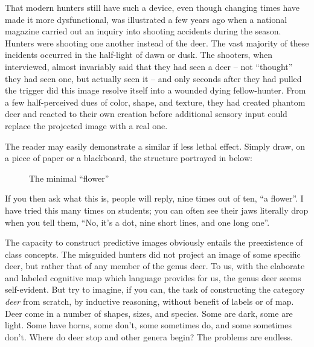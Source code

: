
That modern hunters still have such a device, even though changing times have made it more dysfunctional, was illustrated a few years ago when a national magazine carried out an inquiry into shooting accidents during the  season. Hunters were shooting one another instead of the deer. The vast majority of these incidents occurred in the half-light of dawn or dusk. The shooters, when interviewed, almost invariably said that they had seen a deer -- not ``thought'' they had seen one, but actually seen it -- and only seconds after they had pulled the trigger did this image resolve itself into a wounded dying fellow-hunter. From a few half-perceived dues of color, shape, and texture, they had created phantom deer and reacted to their own creation before additional sensory input could replace the projected image with a real one.

The reader may easily demonstrate a similar if less lethal effect. Simply draw, on a piece of paper or a blackboard, the structure portrayed in  below:

\begin{figure}
	\begin{center}
	\end{center}
	\caption{The minimal ``flower''}\label{fig:4.1}
\end{figure}


\noindent If you then ask what this is, people will reply, nine times out of ten,  ``a flower''. I have tried this many times on students; you can often see their jaws literally drop when you tell them, ``No, it's a dot, nine short lines, and one long one''.

The capacity to construct predictive images obviously entails the preexistence of class concepts. The misguided hunters did not project an image of some specific deer, but rather that of any member of the genus deer. To us, with the elaborate and labeled cognitive map which language provides for us, the genus deer seems self-evident. But try to imagine, if you can, the task of constructing the category \textit{deer} from scratch, by inductive reasoning, without benefit of labels or of map. Deer come in a number of shapes, sizes, and species. Some are dark, some are light. Some have horns, some don't, some sometimes do, and some sometimes don't. Where do deer stop and other genera begin? The problems are endless.

